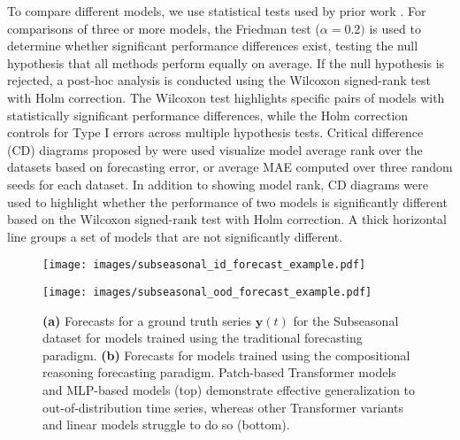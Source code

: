 To compare different models, we use statistical tests used by prior work \citep{IsmailFawaz2018deep, goswami2024aqua}. For comparisons of three or more models, the Friedman test ($\alpha=0.2)$ is used to determine whether significant performance differences exist, testing the null hypothesis that all methods perform equally on average. If the null hypothesis is rejected, a post-hoc analysis is conducted using the Wilcoxon signed-rank test with Holm correction. The Wilcoxon test highlights specific pairs of models with statistically significant performance differences, while the Holm correction controls for Type I errors across multiple hypothesis tests. Critical difference (CD) diagrams proposed by \citet{demsar2006cddiagrams} were used visualize model average rank over the datasets based on forecasting error, or average MAE computed over three random seeds for each dataset. In addition to showing model rank, CD diagrams were used to highlight whether the performance of two models is significantly different based on the Wilcoxon signed-rank test with Holm correction. A thick horizontal line groups a set of models that are not significantly different.


\begin{figure*}[ht!]
    \centering
    \begin{minipage}{0.411\textwidth}
        \centering
        \texttt{[image: images/subseasonal\_id\_forecast\_example.pdf]}
    \end{minipage}
    \hfill
    \begin{minipage}{0.584\textwidth}
        \centering
        \texttt{[image: images/subseasonal\_ood\_forecast\_example.pdf]}
    \end{minipage}
    \caption{\textbf{(a)} Forecasts for a ground truth series $\mathbf{y}(t)$ for the Subseasonal dataset for models trained using the traditional forecasting paradigm. \textbf{(b)} Forecasts for models trained using the compositional reasoning forecasting paradigm. Patch-based Transformer models and MLP-based models (top) demonstrate effective generalization to out-of-distribution time series, whereas other Transformer variants and linear models struggle to do so (bottom).}
    \label{fig:subseasonal_ood_forecast_example_main}
\end{figure*}

